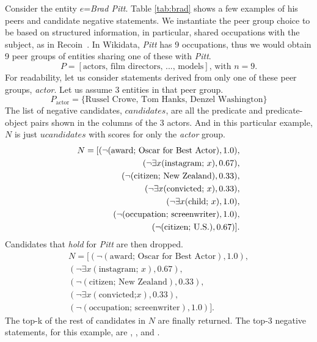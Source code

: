 \begin{example}
Consider the entity $e$=\textit{Brad Pitt}. Table \ref{tab:brad} shows a few examples of his peers and candidate negative statements.
We instantiate the peer group choice to be based on structured information, in particular, shared occupations with the subject, as in Recoin~\cite{RECOIN}. In Wikidata, \textit{Pitt} has 9 occupations, thus we would obtain 9 peer groups of entities sharing one of these with \textit{Pitt}.
\begin{equation*}
P = [\text{actors, film directors, ..., models}] \text{, with } n=9.
\end{equation*}
For readability, let us consider statements derived from only one of these peer groups, \emph{actor}. Let us assume 3 entities in that peer group.
\begin{equation*}
P_\text{actor} = \{\text{Russel Crowe, Tom Hanks,  Denzel Washington}\}
\end{equation*}
The list of negative candidates, $candidates$, are all the predicate and predicate-object pairs shown in the columns of the 3 actors. And in this particular example, $N$ is just $ucandidates$ with scores for only the \textit{actor} group.
\begin{equation*}
\begin{split}
N = [(\neg (\text{award; Oscar for Best Actor}), 1.0),\\  (\neg \exists x(\text{instagram; }x\text), 0.67),\\ 
(\neg (\text{citizen; New Zealand}), 0.33),\\ 
(\neg \exists x(\text{convicted; }x), 0.33),\\ 
(\neg \exists x(\text{child; }x), 1.0),\\  (\neg(\text{occupation; screenwriter}), 1.0),\\  (\neg(\text{citizen; U.S.}), 0.67)].
\end{split}
\end{equation*}
Candidates that \textit{hold} for \textit{Pitt} are then dropped.
\begin{equation*}
\begin{split}
N = [(\neg (\text{award; Oscar for Best Actor}), 1.0),\\  (\neg \exists x(\text{instagram; }x), 0.67),\\ 
(\neg (\text{citizen; New Zealand}), 0.33),\\ 
(\neg \exists x(\text{convicted;} x), 0.33),\\  (\neg(\text{occupation; screenwriter}), 1.0)].
\end{split}
\end{equation*}
 The top-k of the rest of candidates in $N$ are finally returned. The top-3 negative statements, for this example, are , , and . 


\end{example}
